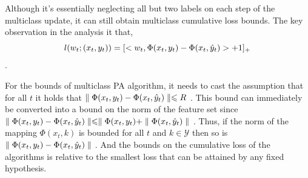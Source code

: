 Although it's essentially neglecting all but two labels on each step of the multiclass update, it can still obtain multiclass cumulative loss bounds. The key observation in the analysis it that,
\[l(w_t;(x_t,y_t)) = [<w_t,\Phi(x_t,y_t)-\Phi(x_t,\hat{y}_t)>+1]_+\].

For the bounds of multiclass PA algorithm, it needs to cast the assumption that for all $t$ it holds that $\parallel{\Phi(x_t,y_t)-\Phi(x_t,\hat{y}_t)}\parallel\leqslant R$ . This bound can immediately be converted into a bound on the norm of the feature set since $\parallel{\Phi(x_t,y_t)-\Phi(x_t,\hat{y}_t)}\parallel \leqslant \parallel{\Phi(x_t,y_t)}+\parallel{\Phi(x_t,\hat{y}_t)}\parallel$ . Thus, if the norm of the mapping $\Phi(x_t,k)$ is bounded for all $t$ and $k\in\mathscr{Y}$ then so is $\parallel{\Phi(x_t,y_t)-\Phi(x_t,\hat{y}_t)}\parallel$ .  And the bounds on the cumulative loss of the algorithms is relative to the smallest loss that can be attained by any fixed hypothesis.